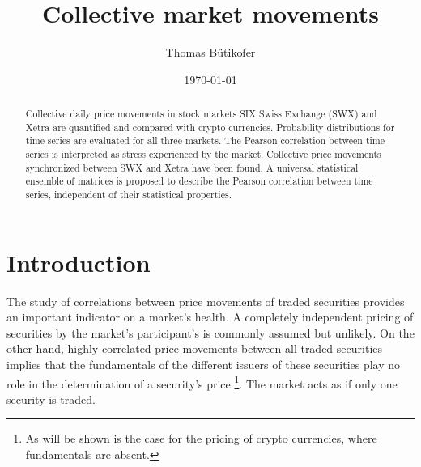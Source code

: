 \documentclass[11pt,twoside,a4paper]{article}
\numberwithin{equation}{section}
\numberwithin{figure}{section}
\numberwithin{table}{section}
\begin{document}
\title{Collective market movements}
\author{Thomas Bütikofer}
\date{\today}
\maketitle
\begin{abstract}
Collective daily price movements in stock markets SIX Swiss Exchange (SWX) and Xetra are quantified and compared with crypto currencies. Probability distributions for time series are evaluated for all three markets. The Pearson correlation between time series is interpreted as stress experienced by the market. Collective price movements synchronized between SWX and Xetra have been found. A universal statistical ensemble of matrices is proposed to describe the Pearson correlation between time series, independent of their statistical properties.
\end{abstract}
\section{Introduction}
The study of correlations between price movements of traded securities provides an important indicator on a market's health. A completely independent pricing of securities by the market's participant's is commonly assumed but unlikely. On the other hand, highly correlated price movements between all traded securities implies that the fundamentals of the different issuers of these securities play no role in the determination of a security's price \footnote{As will be shown is the case for the pricing of crypto currencies, where fundamentals are absent.}. The market acts as if only one security is traded.\\
\end{document}
